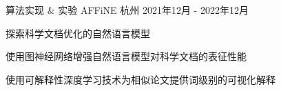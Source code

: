 \begin{cventries}
  \cventry
    {算法实现 \& 实验} %
    {AFFiNE} %
    {杭州} %
    {2021年12月 - 2022年12月} %
    {
      \begin{cvitems}
        \item {探索科学文档优化的自然语言模型}
        \item {使用图神经网络增强自然语言模型对科学文档的表征性能}
        \item {使用可解释性深度学习技术为相似论文提供词级别的可视化解释}
      \end{cvitems}
    }

\end{cventries}